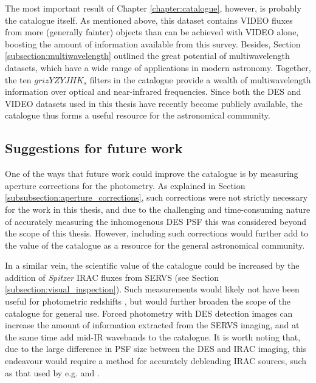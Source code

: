 


The most important result of Chapter \ref{chapter:catalogue}, however, is probably the \DESVIDEO catalogue itself. As mentioned above, this dataset contains VIDEO fluxes from more (generally fainter) objects than can be achieved with VIDEO alone, boosting the amount of information available from this survey. Besides, Section \ref{subsection:multiwavelength} outlined the great potential of multiwavelength datasets, which have a wide range of applications in modern astronomy.  Together, the ten $grizYZYJHK_{s}$ filters in the \DESVIDEO catalogue provide a wealth of multiwavelength information over optical and near-infrared frequencies. Since both the DES and VIDEO datasets used in this thesis have recently become publicly available, the \DESVIDEO catalogue thus forms a useful resource for the astronomical community. \par 

\subsection{Suggestions for future work}
One of the ways that future work could improve the \DESVIDEO catalogue is by measuring aperture corrections for the photometry. As explained in Section \ref{subsubsection:aperture_corrections}, such corrections were not strictly necessary for the work in this thesis, and due to the challenging and time-consuming nature of accurately measuring the inhomogenous DES PSF this was considered beyond the scope of this thesis. However, including such corrections would further add to the value of the catalogue as a resource for the general astronomical community. \par 

In a similar vein, the scientific value of the catalogue could be increased by the addition of \textit{Spitzer} IRAC fluxes from SERVS (see Section \ref{subsection:visual_inspection}). Such measurements would likely not have been useful for photometric redshifts \citep{2010A&A...523A..31H}, but would further broaden the scope of the catalogue for general use. Forced photometry with DES detection images can increase the amount of information extracted from the SERVS imaging, and at the same time add mid-IR wavebands to the catalogue. It is worth noting that, due to the large difference in PSF size between the DES and IRAC imaging, this endeavour would require a method for accurately deblending IRAC sources, such as that used by e.g. \cite{2006ApJ...649L..67L} and \cite{2013ApJS..206....8M}. \par 

